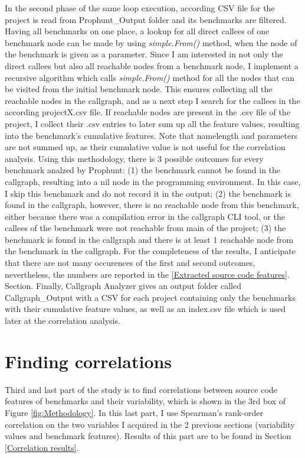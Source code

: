 \documentclass{seal_thesis}
\begin{document}
In the second phase of the same loop execution, according CSV file for the project is read from Prophunt\_Output folder and its benchmarks are filtered. Having all benchmarks on one place, a lookup for all direct callees of one benchmark node can be made by using \textit{simple.From()} method, when the node of the benchmark is given as a parameter. Since I am interested in not only the direct callees but also all reachable nodes from a benchmark node, I implement a recursive algorithm which calls \textit{simple.From()} method for all the nodes that can be visited from the initial benchmark node. This ensures collecting all the reachable nodes in the callgraph, and as a next step I search for the callees in the according projectX.csv file. If reachable nodes are present in the .csv file of the project, I collect their .csv entries to later sum up all the feature values, resulting into the benchmark's cumulative features. Note that namelength and parameters are not summed up, as their cumulative value is not useful for the correlation analysis. Using this methodology, there is 3 possible outcomes for every benchmark analzed by Prophunt: (1) the benchmark cannot be found in the callgraph, resulting into a nil node in the programming environment. In this case, I skip this benchmark and do not record it in the output; (2) the benchmark is found in the callgraph, however, there is no reachable node from this benchmark, either because there was a compilation error in the callgraph CLI tool, or the callees of the benchmark were not reachable from main of the project; (3) the benchmark is found in the callgraph and there is at least 1 reachable node from the benchmark in the callgraph. For the completeness of the results, I anticipate that there are not many occurences of the first and second outcomes, nevertheless, the numbers are reported in the \ref{Extracted source code features}. Section. Finally, Callgraph Analyzer gives an output folder called Callgraph\_Output with a CSV for each project containing only the benchmarks with their cumulative feature values, as well as an index.csv file which is used later at the correlation analysis.

\section{Finding correlations}

Third and last part of the study is to find correlations between source code features of benchmarks and their variability, which is shown in the 3rd box of Figure \ref{fig:Methodology}. In this last part, I use Spearman's rank-order correlation on  the two variables I acquired in the 2 previous sections (variability values and benchmark features). Results of this part are to be found in Section \ref{Correlation results}.
\end{document}
